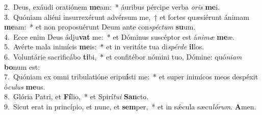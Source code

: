 {2.~}Deus, exáudi oratiónem \textbf{me}am:~* áuribus pércipe verba \textit{o}\textit{ris} \textbf{me}i.\\
{3.~}Quóniam aliéni insurrexérunt advérsum me,~† et fortes quæsiérunt ánimam \textbf{me}am:~* et non proposuérunt Deum ante con\textit{spé}\textit{ctum} \textbf{su}um.\\
{4.~}Ecce enim Deus ádju\textbf{vat} me:~* et Dóminus suscéptor est á\textit{ni}\textit{mæ} \textbf{me}æ.\\
{5.~}Avérte mala inimícis \textbf{me}is:~* et in veritáte tua di\textit{spér}\textit{de} \textbf{il}los.\\
{6.~}Voluntárie sacrificábo \textbf{ti}bi,~* et confitébor nómini tuo, Dómine: quó\textit{ni}\textit{am} \textbf{bo}num est:\\
{7.~}Quóniam ex omni tribulatióne eripu\textbf{í}sti me:~* et super inimícos meos despéxit ó\textit{cu}\textit{lus} \textbf{me}us.\\
{8.~}Glória Patri, et \textbf{Fí}lio,~* et Spirí\textit{tu}\textit{i} \textbf{San}cto.\\
{9.~}Sicut erat in princípio, et nunc, et \textbf{sem}per,~* et in sǽcula sæcu\textit{ló}\textit{rum}. \textbf{A}men.\\
